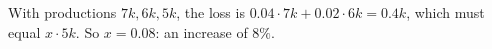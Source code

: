 With productions $7k,6k,5k$, the loss is $0.04\cdot7k+0.02\cdot6k=0.4k$, which must equal $x\cdot5k$. So $x=0.08$: an increase of $\boxed{8\%}$.

